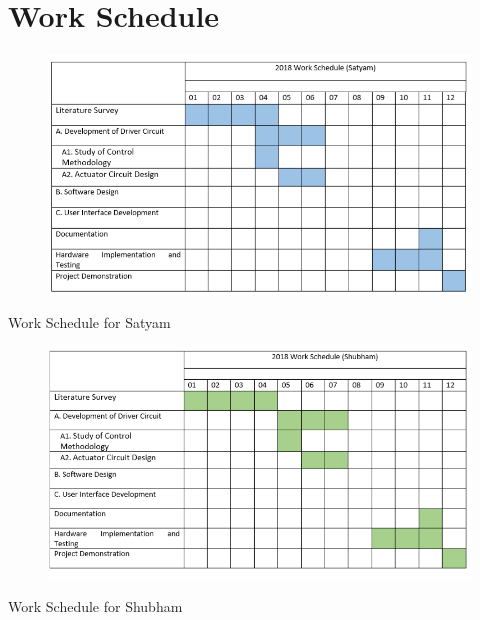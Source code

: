         \section{Work Schedule}
        	\begin{table}[H]
        		\begin{figure}[H]
        			\centering
        			\includegraphics[width=\textwidth]{photos/gantt/SatyamGC.png}
        		\end{figure}
	        	\caption{Work Schedule for Satyam}
        	\end{table}
			\begin{table}[H]
				\begin{figure}[H]
					\centering
					\includegraphics[width=\textwidth]{photos/gantt/ShubhamGC.png}
				\end{figure}
				\caption{Work Schedule for Shubham}
			\end{table}
